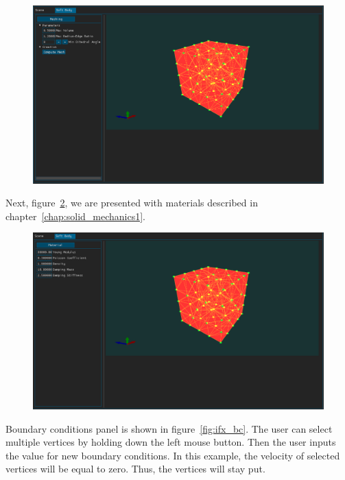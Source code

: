 \documentclass[en]{minipw} %
\begin{document}
\begin{figure}[h!]
\centering
\includegraphics[scale=0.5]{pictures/ifx/ifx_meshing.png}
\caption[Logo MiNI]{}
\label{fig:ifx_meshing}
\end{figure}

Next, figure~\ref{fig:ifx_material}, we are presented with materials described in chapter~\ref{chap:solid_mechanics1}.

\begin{figure}[h!]
\centering
\includegraphics[scale=0.5]{pictures/ifx/ifx_material.png}
\caption[Logo MiNI]{}
\label{fig:ifx_material}
\end{figure}

Boundary conditions panel is shown in figure~\ref{fig:ifx_bc}. The user can select multiple vertices by holding down the left mouse button. Then the user inputs the value for new boundary conditions. In this example, the velocity of selected vertices will be equal to zero. Thus, the vertices will stay put.
\end{document}
